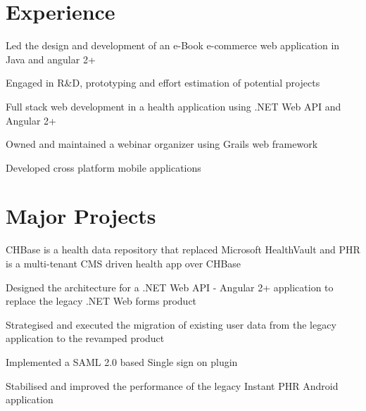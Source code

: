 \documentclass[]{deedy-resume-openfont}
\begin{document}
\begin{minipage}[t]{0.66\textwidth} 


\section{Experience}

\vspace{\topsep} %
\begin{tightemize}
    \item Led the design and development of an e-Book e-commerce web application in Java and angular 2+
    \item Engaged in R\&D, prototyping and effort estimation of potential projects
    \item Full stack web development in a health application using .NET Web API and Angular 2+
    \item Owned and maintained a webinar organizer using Grails web framework 
    \item Developed cross platform mobile applications
    
\end{tightemize}
\sectionsep


\section{Major Projects}

\begin{tightemize} 
    \item CHBase is a health data repository that replaced Microsoft HealthVault and PHR is a multi-tenant CMS driven health app over CHBase
    \item Designed the architecture for a .NET Web API - Angular 2+ application to replace the legacy .NET Web forms product
    \item Strategised and executed the migration of existing user data from the legacy application to the revamped product
    \item Implemented a SAML 2.0 based Single sign on plugin
    \item Stabilised and improved the performance of the legacy Instant PHR Android application
\end{tightemize}
\sectionsep


\end{minipage}
\end{document}
